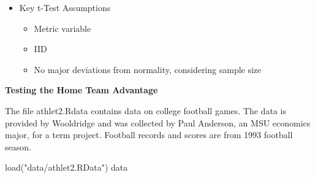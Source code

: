 \documentclass[
]{book}
\newenvironment{Shaded}{\begin{snugshade}}{\end{snugshade}}
\newcommand{\FunctionTok}[1]{\textcolor[rgb]{0.00,0.00,0.00}{#1}}
\newcommand{\NormalTok}[1]{#1}
\newcommand{\StringTok}[1]{\textcolor[rgb]{0.31,0.60,0.02}{#1}}
\providecommand{\tightlist}{%
  \setlength{\itemsep}{0pt}\setlength{\parskip}{0pt}}
\theoremstyle{definition}
\theoremstyle{definition}
\theoremstyle{definition}
\theoremstyle{definition}
\theoremstyle{remark}
\begin{document}
\begin{itemize}
\tightlist
\item
  Key t-Test Assumptions

  \begin{itemize}
  \tightlist
  \item
    Metric variable
  \item
    IID
  \item
    No major deviations from normality, considering sample size
  \end{itemize}
\end{itemize}

\textbf{Testing the Home Team Advantage}

The file athlet2.Rdata contains data on college football games. The data is provided by Wooldridge and was collected by Paul Anderson, an MSU economics major, for a term project. Football records and scores are from 1993 football season.

\begin{Shaded}
\begin{Highlighting}[]
\FunctionTok{load}\NormalTok{(}\StringTok{"data/athlet2.RData"}\NormalTok{)}
\NormalTok{data}
\end{Highlighting}
\end{Shaded}
\end{document}
